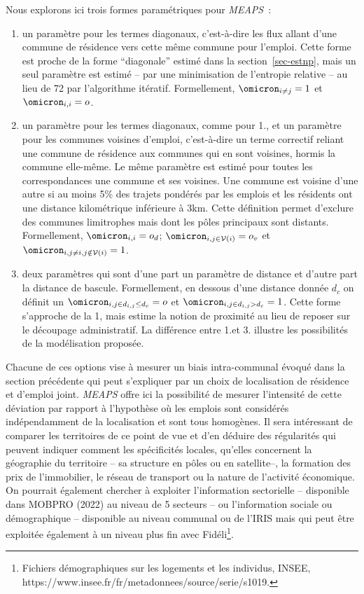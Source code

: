 \documentclass[
  10pt,
  a4paper,
  numbers=noendperiod,
  DIV=9]{scrreprt}
\begin{document}
Nous explorons ici trois formes paramétriques pour \emph{MEAPS}~:

\begin{enumerate}
\def\labelenumi{\arabic{enumi}.}
\item
  un paramètre pour les termes diagonaux, c'est-à-dire les flux allant
  d'une commune de résidence vers cette même commune pour l'emploi.
  Cette forme est proche de la forme ``diagonale'' estimé dans la
  section~\ref{sec-estnp}, mais un seul paramètre est estimé -- par une
  minimisation de l'entropie relative -- au lieu de 72 par l'algorithme
  itératif. Formellement, \(\omicron_{i \neq j}=1\) et
  \(\omicron_{i,i} = o\).
\item
  un paramètre pour les termes diagonaux, comme pour 1., et un paramètre
  pour les communes voisines d'emploi, c'est-à-dire un terme correctif
  reliant une commune de résidence aux communes qui en sont voisines,
  hormis la commune elle-même. Le même paramètre est estimé pour toutes
  les correspondances une commune et ses voisines. Une commune est
  voisine d'une autre si au moins 5\% des trajets pondérés par les
  emplois et les résidents ont une distance kilométrique inférieure à
  3km. Cette définition permet d'exclure des communes limitrophes mais
  dont les pôles principaux sont distants. Formellement,
  \(\omicron_{i,i} = o_d\); \(\omicron_{i,j\in \mathcal{V}(i)} = o_v\)
  et \(\omicron_{i, j \neq i, j \notin \mathcal{V}(i)} = 1\).
\item
  deux paramètres qui sont d'une part un paramètre de distance et
  d'autre part la distance de bascule. Formellement, en dessous d'une
  distance donnée \(d_c\) on définit un
  \(\omicron_{i,j \in d_{i,j} \leq d_c} = o\) et
  \(\omicron_{i,j \in d_{i,j} > d_c} = 1\). Cette forme s'approche de la
  1, mais estime la notion de proximité au lieu de reposer sur le
  découpage administratif. La différence entre 1.et 3. illustre les
  possibilités de la modélisation proposée.
\end{enumerate}

Chacune de ces options vise à mesurer un biais intra-communal évoqué
dans la section précédente qui peut s'expliquer par un choix de
localisation de résidence et d'emploi joint. \emph{MEAPS} offre ici la
possibilité de mesurer l'intensité de cette déviation par rapport à
l'hypothèse où les emplois sont considérés indépendamment de la
localisation et sont tous homogènes. Il sera intéressant de comparer les
territoires de ce point de vue et d'en déduire des régularités qui
peuvent indiquer comment les spécificités locales, qu'elles concernent
la géographie du territoire -- sa structure en pôles ou en satellite--,
la formation des prix de l'immobilier, le réseau de transport ou la
nature de l'activité économique. On pourrait également chercher à
exploiter l'information sectorielle -- disponible dans MOBPRO (2022) au
niveau de 5 secteurs -- ou l'information sociale ou démographique --
disponible au niveau communal ou de l'IRIS mais qui peut être exploitée
également à un niveau plus fin avec Fidéli\footnote{Fichiers
  démographiques sur les logements et les individus, INSEE,
  https://www.insee.fr/fr/metadonnees/source/serie/s1019.}.
\end{document}
